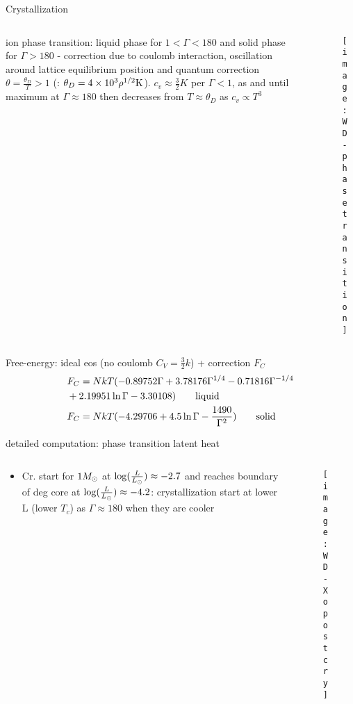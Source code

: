\begin{frame}{Crystallization}
\begin{columns}[T]
	\begin{column}{0.5\textwidth}
ion phase transition: liquid phase for $1<\Gamma<180$ and solid phase for $\Gamma>180$ - correction due to coulomb interaction, oscillation around lattice equilibrium position and quantum correction $\theta=\frac{\theta_D}{T}>1$ (: $\theta_D=\num{4e3}\rho^{1/2}\si{\kelvin}$). $c_v\approx\frac{3}{2}K$ per $\Gamma<1$, as  \xaumenta{\Gamma} and  until maximum at $\Gamma\approx180$ then decreases from $T\approx\theta_D$ as $c_v\propto T^3$
	\end{column}
	\begin{column}{0.5\textwidth}
	\begin{figure}[!ht]
	\texttt{[image: WD-phasetransition]}\label{fig:WD-phasetransition}
	\end{figure}
\end{column}\end{columns}
Free-energy: ideal eos (no coulomb $C_V=\frac{3}{2}k$) + correction $F_C$
\begin{align*}
&F_C=NkT(-0.89752\Gamma+3.78176\Gamma^{1/4}-0.71816\Gamma^{-1/4}\\
&+2.19951\ln\Gamma-3.30108)\tag*{liquid}\\
&F_C=NkT(-4.29706+4.5\ln\Gamma-\frac{1490}{\Gamma^2})\tag*{solid}
\end{align*}
\end{frame}

\begin{frame}{detailed computation: phase transition latent heat}
\begin{columns}[T]
	\begin{column}{0.5\textwidth}
		\begin{itemize}
		\item Cr. start for $1M_{\odot}$ at $\log(\frac{L}{L_{\odot}})\approx-2.7$ and reaches boundary of deg core at $\log(\frac{L}{L_{\odot}})\approx-4.2$:  crystallization start at lower L (lower $T_c$) as  $\Gamma\approx180$ when they are cooler
		\end{itemize}
	\end{column}
	\begin{column}{0.5\textwidth}
		\begin{figure}[!ht]
		\texttt{[image: WD-Xopostcry]}\label{fig:WD-Xopostcry}
		\end{figure}
	\end{column}\end{columns}
\end{frame}

